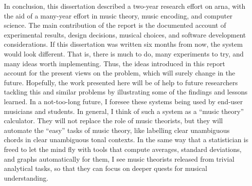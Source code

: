 
In conclusion, this dissertation described a two-year
research effort on \gls{arna}, with the aid of a many-year
effort in music theory, music encoding, and computer
science. The main contribution of the report is the
documented account of experimental results, design
decisions, musical choices, and software development
considerations. If this dissertation was written six months
from now, the system would look different. That is, there is
much to do, many experiments to try, and many ideas worth
implementing. Thus, the ideas introduced in this report
account for the present views on the problem, which will
surely change in the future.  Hopefully, the work presented
here will be of help to future researchers tackling this and
similar problems by illustrating some of the findings and
lessons learned. In a not-too-long future, I foresee these
systems being used by end-user musicians and students. In
general, I think of such a system as a ``music theory''
calculator. They will not replace the role of music
theorists, but they will automate the ``easy'' tasks of
music theory, like labelling clear unambiguous chords in
clear unambiguous tonal contexts. In the same way that a
statistician is freed to let the mind fly with tools that
compute averages, standard deviations, and graphs
automatically for them, I see music theorists released from
trivial analytical tasks, so that they can focus on deeper
quests for musical understanding.
